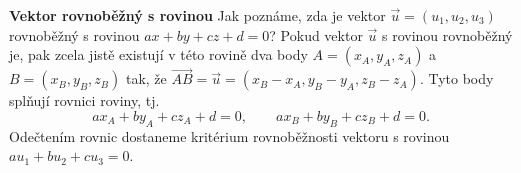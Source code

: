 \begin{mdframed}[style=mdexam]
  \begin{example}\label{mai:exam042}
    \textbf{Vektor rovnoběžný s rovinou}\newline
    Jak poznáme, zda je vektor \(\vec{u} = (u_1, u_2, u_3)\) rovnoběžný s rovinou \(ax + by + cz + 
    d = 0\)? Pokud vektor \(\vec{u}\) s rovinou rovnoběžný je, pak zcela jistě existují v této 
    rovině dva body \(A = (x_A, y_A, z_A)\) a \(B = (x_B, y_B, z_B)\) tak, že \(\overrightarrow{AB} 
    = \vec{u} = (x_B - x_A, y_B - y_A, z_B - z_A)\). Tyto body splňují rovnici roviny, tj.
    \begin{equation*}
      ax_A + by_A + cz_A + d = 0,\qquad ax_B + by_B + cz_B + d = 0.
    \end{equation*}
    Odečtením rovnic dostaneme kritérium rovnoběžnosti vektoru s rovinou \(au_1 + bu_2+ cu_3 = 0\).
  \end{example}
\end{mdframed}